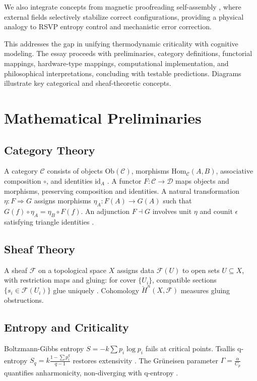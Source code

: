 \documentclass{article}
\begin{document}
We also integrate concepts from magnetic proofreading self-assembly \cite{Liang2025}, where external fields selectively stabilize correct configurations, providing a physical analogy to RSVP entropy control and mechanistic error correction.

This addresses the gap in unifying thermodynamic criticality with cognitive modeling. The essay proceeds with preliminaries, category definitions, functorial mappings, hardware-type mappings, computational implementation, and philosophical interpretations, concluding with testable predictions. Diagrams illustrate key categorical and sheaf-theoretic concepts.

\section{Mathematical Preliminaries}

\subsection{Category Theory}
A category $\mathcal{C}$ consists of objects $\text{Ob}(\mathcal{C})$, morphisms $\text{Hom}_{\mathcal{C}}(A, B)$, associative composition $\circ$, and identities $\text{id}_A$ \cite{Awodey2010, Lawvere2009}. A functor $F: \mathcal{C} \to \mathcal{D}$ maps objects and morphisms, preserving composition and identities. A natural transformation $\eta: F \Rightarrow G$ assigns morphisms $\eta_A: F(A) \to G(A)$ such that $G(f) \circ \eta_A = \eta_B \circ F(f)$. An adjunction $F \dashv G$ involves unit $\eta$ and counit $\epsilon$ satisfying triangle identities \cite{Spivak2014}.

\subsection{Sheaf Theory}
A sheaf $\mathcal{F}$ on a topological space $X$ assigns data $\mathcal{F}(U)$ to open sets $U \subseteq X$, with restriction maps and gluing: for cover $\{U_i\}$, compatible sections $\{s_i \in \mathcal{F}(U_i)\}$ glue uniquely \cite{MacLane1992, Bredon1997}. Cohomology $\check{H}^n(X, \mathcal{F})$ measures gluing obstructions.

\subsection{Entropy and Criticality}
Boltzmann-Gibbs entropy $S = -k \sum p_i \log p_i$ fails at critical points. Tsallis q-entropy $S_q = k \frac{1 - \sum p_i^q}{q-1}$ restores extensivity \cite{Tsallis1988}. The Grüneisen parameter $\Gamma = \frac{\alpha}{C_p}$ quantifies anharmonicity, non-diverging with q-entropy \cite{Soares2023, Soares2024}.
\end{document}
